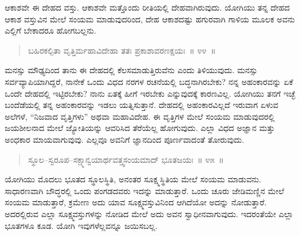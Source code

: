 
ಆಕಾಶವೇ ಈ ದೇಹದ ವಸ್ತು. ಆಕಾಶವೇ ಮತ್ತೊಂದು ರೀತಿಯಲ್ಲಿ ದೇಹವಾಗಿರುವುದು. ಯೋಗಿಯು ತನ್ನ ದೇಹದ ಆಕಾಶ ವಸ್ತುವಿನ ಮೇಲೆ ಸಂಯಮ ಮಾಡುವುದರಿಂದ, ದೇಹ ಆಕಾಶದಷ್ಟು ಹಗುರವಾಗಿ ಗಾಳಿಯ ಮೂಲಕ ಅವನು ಎಲ್ಲಿಗೆ ಬೇಕಾದರೂ ಹೋಗಬಲ್ಲನು. 

\vspace{-0.3cm}

\begin{verse}
ಬಹಿರಕಲ್ಪಿತಾ ವೃತ್ತಿರ್ಮಹಾವಿದೇಹಾ ತತಃ ಪ್ರಕಾಶಾವರಣಕ್ಷಯಃ~॥ ೪೪~॥
\end{verse}

\vspace{-0.3cm}


ಮನಸ್ಸು ಮೌಢ್ಯದಿಂದ ತಾನು ಈ ದೇಹದಲ್ಲಿ ಕೆಲಸಮಾಡುತ್ತಿರುವೆನು ಎಂದು ತಿಳಿಯುವುದು. ಮನಸ್ಸು ಸರ್ವವ್ಯಾಪಿಯಾಗಿದ್ದರೆ, ನಾನೇಕೆ ಒಂದು ವಿಧದ ನರಗಳ ರಚನೆಯಲ್ಲಿ ಬದ್ಧನಾಗಿರಬೇಕು? ನನ್ನ ಅಹಂಕಾರವನ್ನು ಏಕೆ ಒಂದೇ ದೇಹದಲ್ಲಿ ಇಟ್ಟಿರಬೇಕು? ನಾನು ಏತಕ್ಕೆ ಹೀಗೆ ಇರಬೇಕು ಎನ್ನುವುದಕ್ಕೆ ಕಾರಣವಿಲ್ಲ. ಯೋಗಿಯು ತನಗೆ ಇಚ್ಛೆ ಬಂದೆಡೆಯಲ್ಲಿ ತನ್ನ ಅಹಂಕಾರವನ್ನು ಇಡಲು ಯತ್ನಿಸುತ್ತಾನೆ. ದೇಹದಲ್ಲಿ ಅಹಂಕಾರವಿಲ್ಲದೆ ಇರುವಾಗ ಏಳುವ ಅಲೆಗಳೆ, “ನಿಜವಾದ ವೃತ್ತಿಗಳು” ಅಥವಾ ಮಹಾವಿದೇಹ. ಈ ವೃತ್ತಿಗಳ ಮೇಲೆ ಸಂಯಮ ಮಾಡುವುದರಲ್ಲಿ ಜಯಶೀಲನಾದ ಮೇಲೆ ಜ್ಯೋತಿಯನ್ನು ಆವರಿಸಿದ ತೆರೆಯೆಲ್ಲ ಹೋಗುವುದು. ಎಲ್ಲಾ ವಿಧದ ಅಜ್ಞಾನ ಮತ್ತು ಅಂಧಕಾರ ಮಾಯವಾಗುವುವು. ಎಲ್ಲವೂ ಅವನಿಗೆ ಜ್ಞಾನದಿಂದ ಪೂರ್ಣವಾದಂತೆ ತೋರುವುದು. 

\vspace{-0.3cm}

\begin{verse}
ಸ್ಥೂಲ–ಸ್ವರೂಪ–ಸಕ್ಷ್ಮಾನ್ವಯಾರ್ಥವತ್ತ್ವಸಂಯಮಾದ್​ ಭೂತಜಯಃ~॥ ೪೫~॥
\end{verse}

\vspace{-0.3cm}


ಯೋಗಿಯು ಮೊದಲು ಭೂತದ ಸ್ಥೂಲಸ್ಥಿತಿ, ಅನಂತರ ಸೂಕ್ಷ್ಮಸ್ಥಿತಿಯ ಮೇಲೆ ಸಂಯಮ ಮಾಡುವನು. ಸಾಧಾರಣವಾಗಿ ಬೌದ್ಧರಲ್ಲಿ ಒಂದು ಪಂಗಡದವರು ಇದನ್ನು ಮಾಡುತ್ತಾರೆ. ಒಂದು ಚೂರು ಜೇಡಿಮಣ್ಣಿನ ಮೇಲೆ ಸಂಯಮ ಮಾಡುತ್ತಾರೆ, ಕ್ರಮೇಣ ಅದು ಯಾವ ಸೂಕ್ಷ್ಮವಸ್ತುವಿನಿಂದ ಆಗಿದೆಯೋ ಅದನ್ನು ನೋಡುತ್ತಾರೆ. ಅದರಲ್ಲಿರುವ ಎಲ್ಲಾ ಸೂಕ್ಷ್ಮವಸ್ತುಗಳನ್ನು ನೋಡಿದ ಮೇಲೆ ಅದು ಅವನ ಸ್ವಾಧೀನವಾಗುವುದು. ಇದರಂತೆಯೇ ಎಲ್ಲಾ ಭೂತಗಳೂ ಕೂಡ. ಯೋಗಿ ಇವುಗಳೆಲ್ಲವನ್ನೂ ಜಯಿಸಬಲ್ಲ. 

\vspace{-0.3cm}

